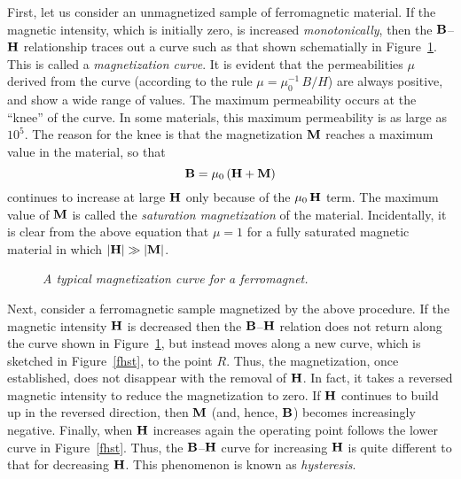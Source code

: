 First, let us consider an unmagnetized sample of ferromagnetic material.
If the magnetic intensity, which is initially zero, is increased
{\em monotonically}, then the ${\bf B}$--${\bf H}$ relationship
traces out a curve such as that shown schematially in Figure~\ref{fbh}. This is called a
{\em magnetization curve}. It is evident that the permeabilities
$\mu$ derived from the curve (according to the rule $\mu = \mu_0^{-1}\,B/H$) are
always positive, and show a wide range of values. The maximum permeability
occurs at the ``knee'' of the curve. In some materials, this
maximum permeability is as large as $10^5$. The reason for
the knee is that the magnetization ${\bf M}$ reaches
a maximum value in the material, so that
\begin{equation}\label{e5.127x}
{\bf B} = \mu_0\,({\bf H} + {\bf M})
\end{equation}
continues to increase at large ${\bf H}$ only because of the
$\mu_0\,{\bf H}$ term. The maximum value of ${\bf M}$ is
called the {\em saturation magnetization} of the material. Incidentally, it is clear
from the above equation that $\mu=1$ for a fully saturated magnetic
material in which $|{\bf H}|\gg |{\bf M}|$.
\begin{figure}
\epsfysize=2.5in
\centerline{}
\caption{\em A typical magnetization curve for a ferromagnet.}\label{fbh}
\end{figure}

Next, consider a ferromagnetic sample magnetized by the above procedure.
If the magnetic intensity ${\bf H}$ is decreased then the ${\bf B}$--${\bf H}$
relation does not return along the curve shown in Figure~\ref{fbh}, but instead
moves along a new curve, which is sketched in Figure~\ref{fhst}, to the point $R$. 
Thus, the magnetization, once established, does not disappear with the removal
of ${\bf H}$. In fact, it takes a reversed magnetic intensity to
reduce the magnetization to zero. If ${\bf H}$ continues to
build up in the reversed direction, then ${\bf M}$ (and,
hence, ${\bf B}$) becomes increasingly negative. Finally,
when ${\bf H}$ increases again the operating point follows the lower
curve in Figure~\ref{fhst}. Thus, the ${\bf B}$--${\bf H}$ curve for
increasing ${\bf H}$ is quite different to that for decreasing
${\bf H}$. This phenomenon is known as {\em hysteresis}.
 

